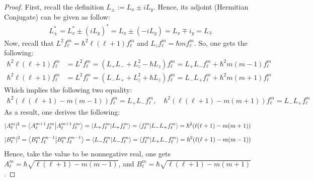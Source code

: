 \documentclass{article}
\begin{document}
\begin{proof}
    First, recall the definition $L_\pm:= L_x \pm iL_y$. Hence, its adjoint (Hermitian Conjugate) can be given as follow:
    \begin{align}
        L_\pm^* = L_x^* \pm (iL_y)^* = L_x \pm (-iL_y) = L_x \mp i_y = L_\mp
    \end{align}
    Now, recall that $L^2 f^m_\ell = \hbar^2\ell(\ell+1)f^m_\ell$ and $L_z f^m_\ell = \hbar mf^m_\ell$. So, one gets the following:
    \begin{align}
        \hbar^2\ell(\ell+1)f^m_\ell &= L^2f^m_\ell= (L_+L_-+L_z^2 - \hbar L_z)f^m_\ell= L_+L_-f^m_\ell + \hbar^2 m(m-1)f^m_\ell
    \end{align}
    \begin{align}
        \hbar^2\ell(\ell+1)f^m_\ell &= L^2f^m_\ell= (L_-L_++L_z^2 + \hbar L_z)f^m_\ell= L_-L_+f^m_\ell + \hbar^2 m(m+1)f^m_\ell
    \end{align}
    Which implies the following two equality:
    \begin{align}
        \hbar^2(\ell(\ell+1)-m(m-1))f^m_\ell = L_+L_-f^m_\ell,\quad \hbar^2(\ell(\ell+1)-m(m+1))f^m_\ell = L_-L_+f^m_\ell
    \end{align}
    As a result, one derives the following:
    \begin{align}
        |A^m_\ell|^2 &= \braket{A^{m+1}_\ell f^m_\ell}{A^{m+1}_\ell f^m_\ell} = \braket{L_+f^m_\ell}{L_+f^m_\ell}=\braket{f^m_\ell}{L_-L_+f^m_\ell} = \hbar^2(\ell(\ell+1)-m(m+1))
    \end{align}
    \begin{align}
        |B^m_\ell|^2 &= \braket{B^m_\ell f^{m-1}_\ell}{B^m_\ell f^{m-1}_\ell} = \braket{L_-f^m_\ell}{L_-f^m_\ell}=\braket{f^m_\ell}{L_+L_-f^m_\ell} = \hbar^2(\ell(\ell+1)-m(m-1))
    \end{align}
    Hence, take the value to be nonnegative real, one gets $A^m_\ell = \hbar\sqrt{\ell(\ell+1)-m(m-1)}$, and $B^m_\ell = \hbar\sqrt{\ell(\ell+1)-m(m+1)}$.
\end{proof}

\newpage
\end{document}
